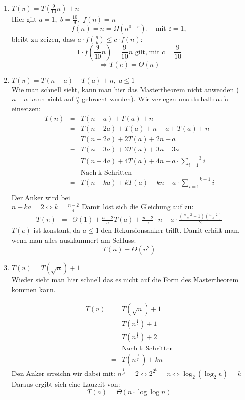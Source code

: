 \documentclass[11pt,a4paper,ngerman]{article}
\begin{document}
\begin{enumerate}[\bfseries (a)]

\item $T(n) = T(\frac{9}{10} n) + n$\\
Hier gilt $a = 1, \; b = \frac{10}{9}, \; f(n) = n$
$$
f(n) = n = \Omega (n^{0 + \varepsilon}), \quad \text{mit } \varepsilon = 1,
$$
bleibt zu zeigen, dass $a \cdot f(\frac{n}{b}) \leq c \cdot f(n)$:
$$
1 \cdot f(\frac{9}{10} n) = \frac{9}{10}n \text{ gilt, mit } c = \frac{9}{10}
$$
$$
\Rightarrow T(n) = \Theta (n)
$$

\item $T(n) = T(n-a) + T(a) + n, \; a\leq 1$\\
Wie man schnell sieht, kann man hier das Mastertheorem nicht anwenden ($n-a$ kann nicht auf $\frac{n}{b}$ gebracht werden). Wir verlegen uns deshalb aufs einsetzen:
$$
\begin{array}{rcl}
T(n) &=& T(n - a) + T(a) + n\\
&=& T(n - 2a) + T(a) + n - a + T(a) + n\\
&=& T(n - 2a) + 2T(a) + 2n - a\\
&=& T(n - 3a) +3 T(a) +3n - 3a\\
&=& T(n - 4a) +4T(a) + 4n - a \cdot \overset{3}{\underset{i=1}{\sum}} i\\
&& \text{Nach k Schritten}\\
&=& T(n - ka) + kT(a) + kn - a \cdot \overset{k-1}{\underset{i=1}{\sum}} i\\
\end{array}
$$
Der Anker wird bei\\
$n - ka = 2 \Leftrightarrow k = \frac{n-2}{a}$
Damit löst sich die Gleichung auf zu:
$$
\begin{array}{rcl}
T(n) &=& \Theta(1) + \frac{n-2}{a} T(a) + \frac{n-2}{a} \cdot n - a \cdot \frac{(\frac{n-2}{a} - 1)(\frac{n-2}{a})}{2}
\end{array}
$$
$T(a)$ ist konstant, da $a\leq1$ den Rekursionsanker trifft. Damit erhält man, wenn man alles ausklammert am Schluss:
$$
T(n) = \Theta(n^2)
$$

\item $T(n) = T(\sqrt{n}) + 1$\\
Wieder sieht man hier schnell das es nicht auf die Form des Mastertheorem kommen kann.

$$
\begin{array}{rcl}
T(n) &=& T(\sqrt{n}) + 1\\
&=& T(n^{\frac{1}{2}}) + 1\\
&=& T(n^{\frac{1}{4}}) + 2\\
&& \text{Nach k Schritten}\\
&=& T(n^{\frac{1}{2^k}}) + kn
\end{array}
$$
Den Anker erreichn wir dabei mit:
$n^{\frac{1}{2^k}} = 2 \Leftrightarrow 2^{2^k} = n \Leftrightarrow \log_2 (\log _2 n) = k$\\
Daraus ergibt sich eine Lauzeit von:
$$T(n) = \Theta ( n \cdot \log \log n)$$



\end{enumerate}
\end{document}

